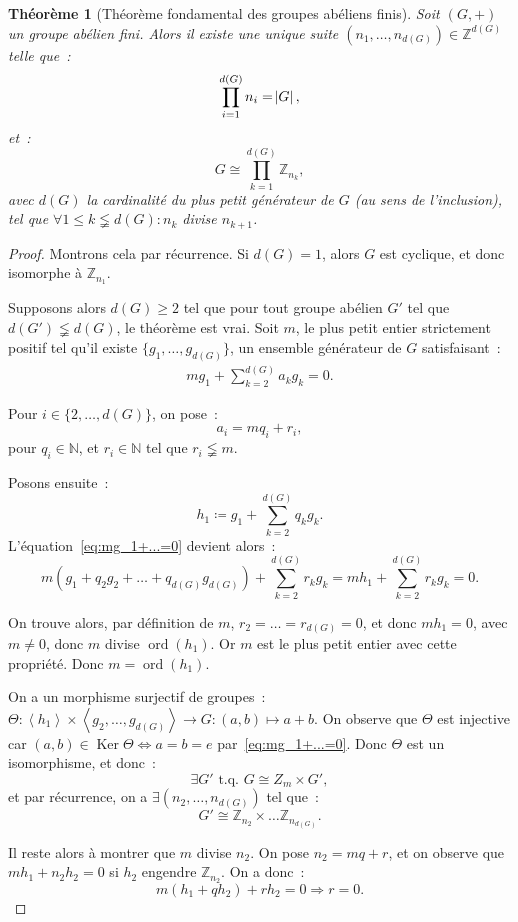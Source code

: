 \documentclass{article}
\newtheorem{thm}{Théorème}[section]
\theoremstyle{definition}
\theoremstyle{remark}
\DeclareMathOperator{\ord}{ord}
\DeclareMathOperator{\Ker}{Ker}
\newcommand{\Z}{\mathbb Z}
\newcommand{\N}{\mathbb N}
\newcommand{\tq}{\text{ t.q. }}
\newcommand{\simeqq}{\cong}
\newcommand{\eng}[1]{\left\langle#1\right\rangle}
\begin{document}
	\begin{thm}[Théorème fondamental des groupes abéliens finis] Soit $(G, +)$ un groupe abélien fini. Alors il existe une unique suite
	$(n_1, \ldots, n_{d(G)}) \in \Z^{d(G)}$ telle que~:
	\[\prod_{i=1}^{d(G)}n_i = \abs G,\]
	et~:
	\[G \simeqq \prod_{k=1}^{d(G)}\Z_{n_k},\]
	avec $d(G)$ la cardinalité du plus petit générateur de $G$ (au sens de l'inclusion), tel que $\forall 1 \leq k \lneqq d(G) : n_k$ divise $n_{k+1}$.
	\end{thm}

	\begin{proof} Montrons cela par récurrence. Si $d(G) = 1$, alors $G$ est cyclique, et donc isomorphe à $\Z_{n_1}$.

	Supposons alors $d(G) \geq 2$ tel que pour tout groupe abélien $G'$ tel que $d(G') \lneqq d(G)$, le théorème est vrai. Soit $m$, le plus petit entier
	strictement positif tel qu'il existe $\{g_1, \ldots, g_{d(G)}\}$, un ensemble générateur de $G$ satisfaisant~:
	\begin{align}\label{eq:mg_1+...=0}
		mg_1 + \sum_{k=2}^{d(G)}a_kg_k = 0.
	\end{align}

	Pour $i \in \{2, \ldots, d(G)\}$, on pose~:
	\[a_i = mq_i + r_i,\]
	pour $q_i \in \N$, et $r_i \in \N$ tel que $r_i \lneqq m$.

	Posons ensuite~:
	\[h_1 \coloneqq g_1 + \sum_{k=2}^{d(G)}q_kg_k.\]
	L'équation~\eqref{eq:mg_1+...=0} devient alors~:
	\[m\left(g_1 + q_2g_2 + \ldots + q_{d(G)}g_{d(G)}\right) + \sum_{k=2}^{d(G)}r_kg_k = mh_1 + \sum_{k=2}^{d(G)}r_kg_k = 0.\]

	On trouve alors, par définition de $m$, $r_2 = \ldots = r_{d(G)} = 0$, et donc $mh_1 = 0$, avec $m \neq 0$, donc $m$ divise $\ord(h_1)$. Or $m$ est le
	plus petit entier avec cette propriété. Donc $m = \ord(h_1)$.

	On a un morphisme surjectif de groupes~: $\Theta : \eng {h_1} \times \eng {g_2, \ldots, g_{d(G)}} \to G : (a, b) \mapsto a+b$. On observe que $\Theta$
	est injective car $(a, b) \in \Ker \Theta \iff a = b = e$ par~\eqref{eq:mg_1+...=0}. Donc $\Theta$ est un isomorphisme, et donc~:
	\[\exists G' \tq G \simeqq Z_m \times G',\]
	et par récurrence, on a $\exists (n_2, \ldots, n_{d(G)})$ tel que~:
	\[G' \simeqq \Z_{n_2} \times \ldots \Z_{n_{d(G)}}.\]

	Il reste alors à montrer que $m$ divise $n_2$. On pose $n_2 = mq + r$, et on observe que $mh_1 + n_2h_2 = 0$ si $h_2$ engendre $\Z_{n_2}$. On a donc~:
	\[m\left(h_1 + qh_2\right) + rh_2 = 0 \Rightarrow r = 0.\]
	\end{proof}
\end{document}
